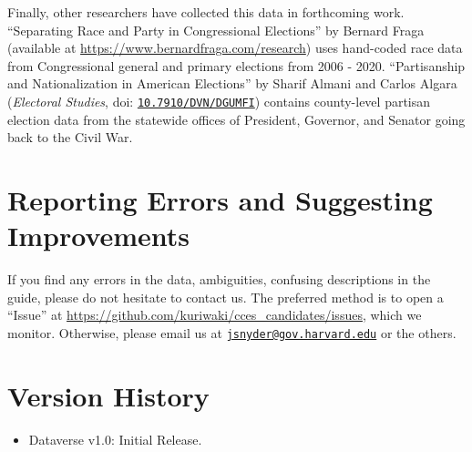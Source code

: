 \documentclass[12pt]{article}
\begin{document}


Finally, other researchers have collected this data in forthcoming work. ``Separating Race and Party in Congressional
Elections'' by Bernard Fraga (available at \url{https://www.bernardfraga.com/research}) uses hand-coded race data from Congressional general and primary elections from 2006 - 2020. ``Partisanship and Nationalization in American Elections'' by Sharif Almani and Carlos Algara (\emph{Electoral Studies}, doi: \href{https://doi.org/10.7910/DVN/DGUMFI}{\texttt{10.7910/DVN/DGUMFI}}) contains county-level partisan election data from the statewide offices of President, Governor, and Senator going back to the Civil War. 

\section{Reporting Errors and Suggesting Improvements}

If you find any errors in the data, ambiguities, confusing descriptions in the guide, please do not hesitate to contact us. The preferred method is to open a ``Issue'' at \url{https://github.com/kuriwaki/cces_candidates/issues}, which we monitor. Otherwise, please email us at \href{mailto:jsnyder@gov.harvard.edu}{\texttt{jsnyder@gov.harvard.edu}} or the others.



\section{Version History}

\begin{itemize}
\item Dataverse v1.0: Initial Release.
\end{itemize}	


	
\end{document}
